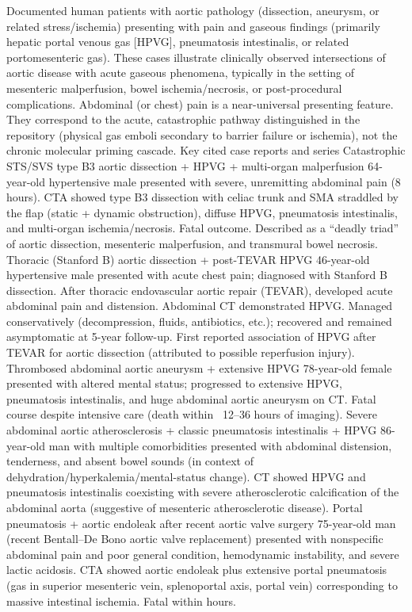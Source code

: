 Documented human patients with aortic pathology (dissection, aneurysm, or related stress/ischemia) presenting with pain and gaseous findings (primarily hepatic portal venous gas [HPVG], pneumatosis intestinalis, or related portomesenteric gas).
These cases illustrate clinically observed intersections of aortic disease with acute gaseous phenomena, typically in the setting of mesenteric malperfusion, bowel ischemia/necrosis, or post-procedural complications. Abdominal (or chest) pain is a near-universal presenting feature. They correspond to the acute, catastrophic pathway distinguished in the repository (physical gas emboli secondary to barrier failure or ischemia), not the chronic molecular priming cascade.
Key cited case reports and series
Catastrophic STS/SVS type B3 aortic dissection + HPVG + multi-organ malperfusion
64-year-old hypertensive male presented with severe, unremitting abdominal pain (8 hours). CTA showed type B3 dissection with celiac trunk and SMA straddled by the flap (static + dynamic obstruction), diffuse HPVG, pneumatosis intestinalis, and multi-organ ischemia/necrosis. Fatal outcome. Described as a “deadly triad” of aortic dissection, mesenteric malperfusion, and transmural bowel necrosis.
Thoracic (Stanford B) aortic dissection + post-TEVAR HPVG
46-year-old hypertensive male presented with acute chest pain; diagnosed with Stanford B dissection. After thoracic endovascular aortic repair (TEVAR), developed acute abdominal pain and distension. Abdominal CT demonstrated HPVG. Managed conservatively (decompression, fluids, antibiotics, etc.); recovered and remained asymptomatic at 5-year follow-up. First reported association of HPVG after TEVAR for aortic dissection (attributed to possible reperfusion injury).
Thrombosed abdominal aortic aneurysm + extensive HPVG
78-year-old female presented with altered mental status; progressed to extensive HPVG, pneumatosis intestinalis, and huge abdominal aortic aneurysm on CT. Fatal course despite intensive care (death within ~12–36 hours of imaging).
Severe abdominal aortic atherosclerosis + classic pneumatosis intestinalis + HPVG
86-year-old man with multiple comorbidities presented with abdominal distension, tenderness, and absent bowel sounds (in context of dehydration/hyperkalemia/mental-status change). CT showed HPVG and pneumatosis intestinalis coexisting with severe atherosclerotic calcification of the abdominal aorta (suggestive of mesenteric atherosclerotic disease).
Portal pneumatosis + aortic endoleak after recent aortic valve surgery
75-year-old man (recent Bentall–De Bono aortic valve replacement) presented with nonspecific abdominal pain and poor general condition, hemodynamic instability, and severe lactic acidosis. CTA showed aortic endoleak plus extensive portal pneumatosis (gas in superior mesenteric vein, splenoportal axis, portal vein) corresponding to massive intestinal ischemia. Fatal within hours.
